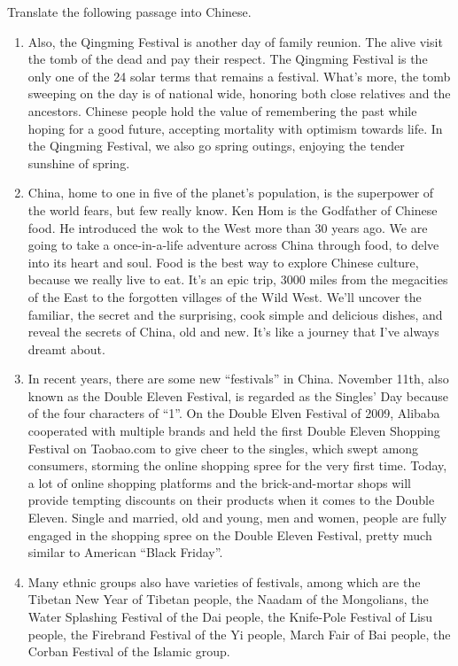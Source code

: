 \begin{problem}
    Translate the following passage into Chinese.
    \begin{enumerate}
        \item Also, the Qingming Festival is another day of family reunion. The alive visit the tomb of the dead and pay their respect. The Qingming Festival is the only one of the 24 solar terms that remains a festival. What's more, the tomb sweeping on the day is of national wide, honoring both close relatives and the ancestors. Chinese people hold the value of remembering the past while hoping for a good future, accepting mortality with optimism towards life. In the Qingming Festival, we also go spring outings, enjoying the tender sunshine of spring.
        \item China, home to one in five of the planet's population, is the superpower of the world fears, but few really know. Ken Hom is the Godfather of Chinese food. He introduced the wok to the West more than 30 years ago. We are going to take a once-in-a-life adventure across China through food, to delve into its heart and soul. Food is the best way to explore Chinese culture, because we really live to eat. It's an epic trip, 3000 miles from the megacities of the East to the forgotten villages of the Wild West. We'll uncover the familiar, the secret and the surprising, cook simple and delicious dishes, and reveal the secrets of China, old and new. It's like a journey that I've always dreamt about.
        \item In recent years, there are some new “festivals” in China. November 11th, also known as the Double Eleven Festival, is regarded as the Singles' Day because of the four characters of “1”. On the Double Elven Festival of 2009, Alibaba cooperated with multiple brands and held the first Double Eleven Shopping Festival on Taobao.com to give cheer to the singles, which swept among consumers, storming the online shopping spree for the very first time. Today, a lot of online shopping platforms and the brick-and-mortar shops will provide tempting discounts on their products when it comes to the Double Eleven. Single and married, old and young, men and women, people are fully engaged in the shopping spree on the Double Eleven Festival, pretty much similar to American “Black Friday”.
        \item Many ethnic groups also have varieties of festivals, among which are the Tibetan New Year of Tibetan people, the Naadam of the Mongolians, the Water Splashing Festival of the Dai people, the Knife-Pole Festival of Lisu people, the Firebrand Festival of the Yi people, March Fair of Bai people, the Corban Festival of the Islamic group.

\end{enumerate}
\end{problem}
